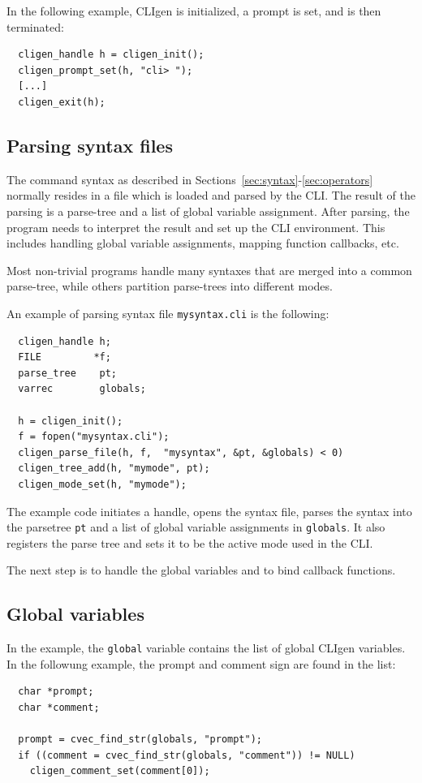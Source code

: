 \documentclass[a4paper, 10pt] {article}
\begin{document}
In the following example, CLIgen is initialized, a prompt is set, and
is then terminated:
\begin{verbatim}
  cligen_handle h = cligen_init();
  cligen_prompt_set(h, "cli> ");
  [...]
  cligen_exit(h);
\end{verbatim}

\subsection{Parsing syntax files}
\label{sec:parsing}
The command syntax as described in
Sections~\ref{sec:syntax}-\ref{sec:operators} normally resides in a
file which is loaded and parsed by the CLI. The result of the parsing
is a parse-tree and a list of global variable assignment. After
parsing, the program needs to interpret the result and set up the CLI
environment. This includes handling global variable assignments,
mapping function callbacks, etc. 

Most non-trivial programs handle many syntaxes that are merged into a
common parse-tree, while others partition parse-trees into different
modes.

An example of parsing syntax file {\tt mysyntax.cli} is the following: 
\begin{verbatim}
  cligen_handle h;
  FILE         *f;
  parse_tree    pt;
  varrec        globals;

  h = cligen_init();
  f = fopen("mysyntax.cli");
  cligen_parse_file(h, f,  "mysyntax", &pt, &globals) < 0)
  cligen_tree_add(h, "mymode", pt);
  cligen_mode_set(h, "mymode");
\end{verbatim}

The example code initiates a handle, opens the syntax file, parses the
syntax into the parsetree {\tt pt} and a list of global variable
assignments in {\tt globals}. It also registers the parse tree and sets it to 
be the active mode used in the CLI. 

The next step is to handle the global variables and to bind callback
functions.

\subsection{Global variables}

In the example, the {\tt global} variable contains the list of global
CLIgen variables.  In the followung example, the prompt and comment
sign are found in the list:
\begin{verbatim}
  char *prompt;
  char *comment;

  prompt = cvec_find_str(globals, "prompt");
  if ((comment = cvec_find_str(globals, "comment")) != NULL)
    cligen_comment_set(comment[0]);
\end{verbatim}
\end{document}
